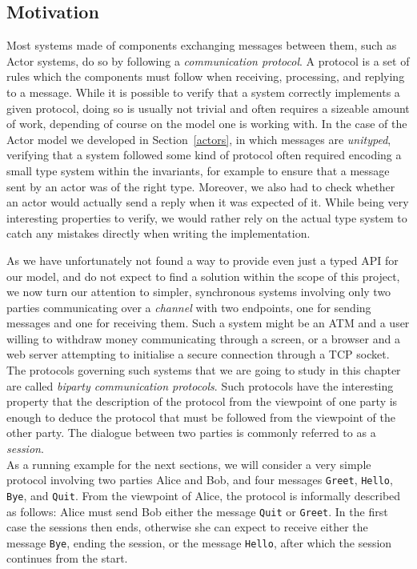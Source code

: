 \documentclass[a4paper,twoside]{article}
\newcommand{\RefSec}[1]{Section~\ref{#1}}
\newcommand{\stt}[1]{\texttt{\small{#1}}}
\begin{document}
\subsection{Motivation}
\label{sess-mot}

Most systems made of components exchanging messages between them, such as Actor systems, do so by following a \textit{communication protocol}. A protocol is a set of rules which the components must follow when receiving, processing, and replying to a message. While it is possible to verify that a system correctly implements a given protocol, doing so is usually not trivial and often requires a sizeable amount of work, depending of course on the model one is working with. In the case of the Actor model we developed in \RefSec{actors}, in which messages are \textit{unityped}, verifying that a system followed some kind of protocol often required encoding a small type system within the invariants, for example to ensure that a message sent by an actor was of the right type. Moreover, we also had to check whether an actor would actually send a reply when it was expected of it. While being very interesting properties to verify, we would rather rely on the actual type system to catch any mistakes directly when writing the implementation.

As we have unfortunately not found a way to provide even just a typed API for our model, and do not expect to find a solution within the scope of this project, we now turn our attention to simpler, synchronous systems involving only two parties communicating over a \textit{channel} with two endpoints, one for sending messages and one for receiving them. Such a system might be an ATM and a user willing to withdraw money communicating through a screen, or a browser and a web server attempting to initialise a secure connection through a TCP socket. The protocols governing such systems that we are going to study in this chapter are called \textit{biparty communication protocols}. Such protocols have the interesting property that the description of the protocol from the viewpoint of one party is enough to deduce the protocol that must be followed from the viewpoint of the other party. The dialogue between two parties is commonly referred to as a \textit{session}.\\

As a running example for the next sections, we will consider a very simple protocol involving two parties Alice and Bob, and four messages \stt{Greet}, \stt{Hello}, \stt{Bye}, and \stt{Quit}.
From the viewpoint of Alice, the protocol is informally described as follows: Alice must send Bob either the message \stt{Quit} or \stt{Greet}. In the first case the sessions then ends, otherwise she can expect to receive either the message \stt{Bye}, ending the session, or the message \stt{Hello}, after which the session continues from the start.\\
\end{document}
